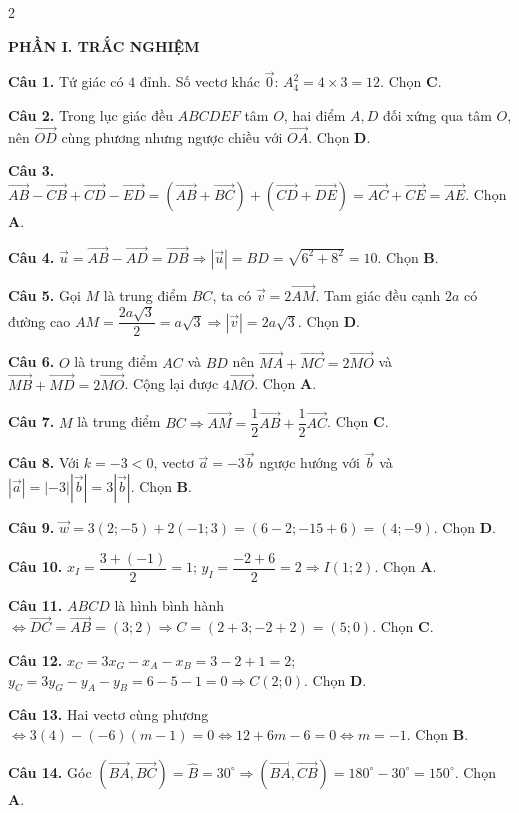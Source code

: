 \documentclass[10pt,a4paper]{article}
\begin{document}
\begin{multicols}{2}
\raggedcolumns
\small

\textbf{\color{accent}PHẦN I. TRẮC NGHIỆM}

\textbf{Câu 1.} Tứ giác có $4$ đỉnh. Số vectơ khác $\vec{0}$: $A_4^2 = 4 \times 3 = 12$. Chọn \textbf{C}.

\textbf{Câu 2.} Trong lục giác đều $ABCDEF$ tâm $O$, hai điểm $A, D$ đối xứng qua tâm $O$, nên $\vec{OD}$ cùng phương nhưng ngược chiều với $\vec{OA}$. Chọn \textbf{D}.

\textbf{Câu 3.} $\vec{AB} - \vec{CB} + \vec{CD} - \vec{ED} = (\vec{AB} + \vec{BC}) + (\vec{CD} + \vec{DE}) = \vec{AC} + \vec{CE} = \vec{AE}$. Chọn \textbf{A}.

\textbf{Câu 4.} $\vec{u} = \vec{AB} - \vec{AD} = \vec{DB} \Rightarrow |\vec{u}| = BD = \sqrt{6^2 + 8^2} = 10$. Chọn \textbf{B}.

\textbf{Câu 5.} Gọi $M$ là trung điểm $BC$, ta có $\vec{v} = 2\vec{AM}$. Tam giác đều cạnh $2a$ có đường cao $AM = \dfrac{2a\sqrt{3}}{2} = a\sqrt{3} \Rightarrow |\vec{v}| = 2a\sqrt{3}$. Chọn \textbf{D}.

\textbf{Câu 6.} $O$ là trung điểm $AC$ và $BD$ nên $\vec{MA} + \vec{MC} = 2\vec{MO}$ và $\vec{MB} + \vec{MD} = 2\vec{MO}$. Cộng lại được $4\vec{MO}$. Chọn \textbf{A}.

\textbf{Câu 7.} $M$ là trung điểm $BC \Rightarrow \vec{AM} = \dfrac{1}{2}\vec{AB} + \dfrac{1}{2}\vec{AC}$. Chọn \textbf{C}.

\textbf{Câu 8.} Với $k = -3 < 0$, vectơ $\vec{a} = -3\vec{b}$ ngược hướng với $\vec{b}$ và $|\vec{a}| = |-3||\vec{b}| = 3|\vec{b}|$. Chọn \textbf{B}.

\textbf{Câu 9.} $\vec{w} = 3(2; -5) + 2(-1; 3) = (6 - 2; -15 + 6) = (4; -9)$. Chọn \textbf{D}.

\textbf{Câu 10.} $x_I = \dfrac{3 + (-1)}{2} = 1$; $y_I = \dfrac{-2 + 6}{2} = 2 \Rightarrow I(1; 2)$. Chọn \textbf{A}.

\textbf{Câu 11.} $ABCD$ là hình bình hành $\Leftrightarrow \vec{DC} = \vec{AB} = (3; 2) \Rightarrow C = (2 + 3; -2 + 2) = (5; 0)$. Chọn \textbf{C}.

\textbf{Câu 12.} $x_C = 3x_G - x_A - x_B = 3 - 2 + 1 = 2$; $y_C = 3y_G - y_A - y_B = 6 - 5 - 1 = 0 \Rightarrow C(2; 0)$. Chọn \textbf{D}.

\textbf{Câu 13.} Hai vectơ cùng phương $\Leftrightarrow 3(4) - (-6)(m - 1) = 0 \Leftrightarrow 12 + 6m - 6 = 0 \Leftrightarrow m = -1$. Chọn \textbf{B}.

\textbf{Câu 14.} Góc $(\vec{BA}, \vec{BC}) = \widehat{B} = 30^\circ \Rightarrow (\vec{BA}, \vec{CB}) = 180^\circ - 30^\circ = 150^\circ$. Chọn \textbf{A}.


\end{multicols}
\end{document}
